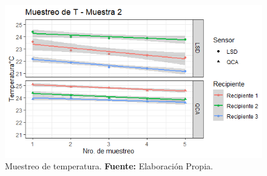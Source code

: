     \begin{figure}[H]
        \centering
        \includegraphics[width=0.75\linewidth]{Imagenes/cap4/T_M2.png}
        \caption {Muestreo de temperatura. \textbf{Fuente:}
        Elaboraci\'on Propia. }
        \label{fig:M2T}
    \end{figure}

